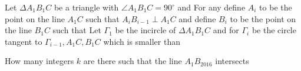 Let $\Delta A_1B_1C$ be a triangle with $\angle A_1B_1C = 90^{\circ}$ and  For any  define $A_i$ to be the point on the line $A_1C$ such that $A_iB_{i-1} \perp A_1C$ and define $B_i$ to be the point on the line $B_1C$ such that  Let $\Gamma_1$ be the incircle of $\Delta A_1B_1C$ and for  $\Gamma_i$ be the circle tangent to $\Gamma_{i-1}, A_1C, B_1C$ which is smaller than 

How many integers $k$ are there such that the line $A_1B_{2016}$ intersects 